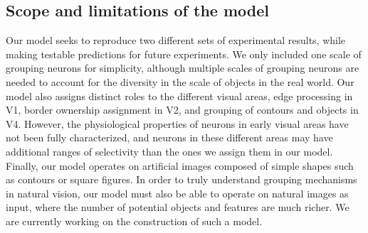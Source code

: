 {\subsection{Scope and limitations of the model}
Our model seeks to reproduce two different sets of experimental
results, while making testable predictions for future experiments. 
We only included one scale of grouping neurons for
simplicity, although 
multiple scales of grouping
neurons are needed to account for the diversity in the scale of
objects in the real world.
Our model also assigns distinct roles to the
different visual areas,  edge processing in V1, border ownership
assignment in V2, and grouping of contours and objects in V4. However,
the physiological properties of neurons in early visual areas have not
been fully characterized, and 
neurons in these different
areas may have 
additional ranges of selectivity
than the ones we assign them in our model. 
Finally, our model operates on artificial
images composed of simple shapes such as contours or square
figures. In order to truly understand grouping mechanisms in natural
vision, our model must also be able to operate on natural images as
input, where the number of potential objects and features are much
richer. We are currently working  
on the construction of such a model.}
